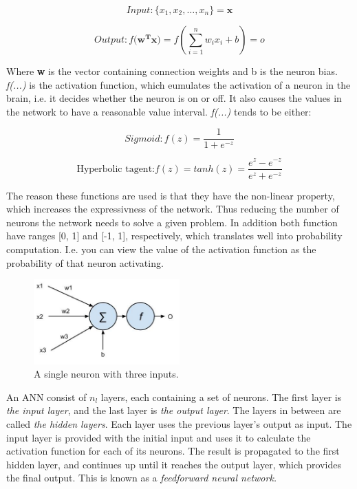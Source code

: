 \begin{equation}\label{eq_neuron_in}
Input: \{x_1, x_2,\dots, x_n\} = \mathbf{x} 
\end{equation}

\begin{equation}\label{eq_neuron_out}
Output: f(\mathbf{w^{T}x)} = f(\sum_{i=1}^{n}w_i x_i + b) = o
\end{equation}

Where \textbf{w} is the vector containing connection weights and b is the neuron bias. \textit{f(...)} is the activation function, which eumulates the activation of a neuron in the brain, i.e. it decides whether the neuron is on or off. It also causes the values in the network to have a reasonable value interval. \textit{f(...)} tends to be either:

\begin{equation}
Sigmoid: f(z) = \frac{1}{1 + e^{-z}}
\end{equation}



\begin{equation}
\text{Hyperbolic tagent:} f(z) = tanh(z) = \frac{e^z - e^{-z}}{e^z + e^{-z}}
\end{equation}

The reason these functions are used is that they have the non-linear property, which increases the expressivness of the network. Thus reducing the number of neurons the network needs to solve a given problem. In addition both function have ranges [0, 1] and [-1, 1], respectively, which translates well into probability computation. I.e. you can view the value of the activation function as the probability of that neuron activating.  
 

\begin{figure}[h!]
  \centering
      \includegraphics[width=0.5\textwidth, scale=0.1]{Figures/Background/Neuron}
  \caption[Neuron]{A single neuron with three inputs. }
  \label{fig_neuron}
\end{figure}

An ANN consist of $ n_l $ layers, each containing a set of neurons. The first layer is \textit{the input layer}, and the last layer is \textit{the output layer}. The layers in between are called \textit{the hidden layers}. Each layer uses the previous layer's output as input. The input layer is provided with the initial input and uses it to calculate the activation function for each of its neurons. The result is propagated to the first hidden layer, and continues up until it reaches the output layer, which provides the final output. This is known as a \textit{feedforward neural network.}

